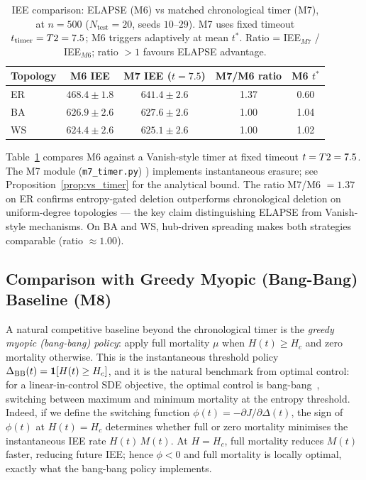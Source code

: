 \documentclass[review,12pt]{elsarticle}
\newcommand{\Hc}{H_c}
\begin{document}
\begin{table}[htbp]
  \caption{IEE comparison: ELAPSE (M6) vs matched chronological timer (M7),
           at $n=500$ ($N_{\mathrm{test}}=20$, seeds $10$--$29$).
           M7 uses fixed timeout $t_{\mathrm{timer}}=T\/2=7.5$; M6 triggers adaptively at mean $t^*$.
           Ratio = IEE$_{M7}$ / IEE$_{M6}$; ratio $>1$ favours ELAPSE
           advantage.}
  \label{tab:m7}
  \centering
  \small
  \renewcommand{\arraystretch}{1.2}
  \begin{tabular}{lcccc}
    \toprule
    Topology & M6 IEE & M7 IEE ($t{=}7.5$) & M7/M6 ratio & M6 $t^*$ \\
    \midrule
    ER & $468.4\pm 1.8$ & $641.4\pm 2.6$ & 1.37 & 0.60 \\
    BA & $626.9\pm 2.6$ & $627.6\pm 2.6$ & 1.00 & 1.04 \\
    WS & $624.4\pm 2.6$ & $625.1\pm 2.6$ & 1.00 & 1.02 \\
    \bottomrule
  \end{tabular}
\end{table}

\noindent
Table~\ref{tab:m7} compares M6 against a Vanish-style timer at fixed timeout $t=T\/2=7.5$. The M7 module (\texttt{m7\_timer.py})
) implements instantaneous erasure; see Proposition~\ref{prop:vs_timer} for the analytical bound. The
ratio M7/M6 $= 1.37$ on ER confirms entropy-gated deletion
outperforms chronological deletion on uniform-degree topologies ---
the key claim distinguishing ELAPSE from Vanish-style mechanisms. On BA and WS, hub-driven spreading makes both strategies comparable (ratio $\approx 1.00$).

\subsection{Comparison with Greedy Myopic (Bang-Bang) Baseline (M8)}
\label{sec:greedy}

A natural competitive baseline beyond the chronological timer is the
\emph{greedy myopic (bang-bang) policy}: apply full mortality $\mu$ when
$H(t) \geq \Hc$ and zero mortality otherwise.  This is the instantaneous
threshold policy $\Delta_{\rm BB}(t) = \mathbf{1}[H(t) \geq \Hc]$, and
it is the natural benchmark from optimal control: for a linear-in-control
SDE objective, the optimal control is bang-bang~\cite{oksendal2003stochastic},
switching between maximum and minimum mortality at the entropy threshold.
Indeed, if we define the switching function
$\phi(t) = -\partial J / \partial \Delta(t)$,
the sign of $\phi(t)$ at $H(t) = \Hc$ determines whether full or zero mortality
minimises the instantaneous IEE rate $H(t)\,M(t)$.  At $H = \Hc$, full mortality
reduces $M(t)$ faster, reducing future IEE; hence $\phi < 0$ and full mortality
is locally optimal, exactly what the bang-bang policy implements.
\end{document}
